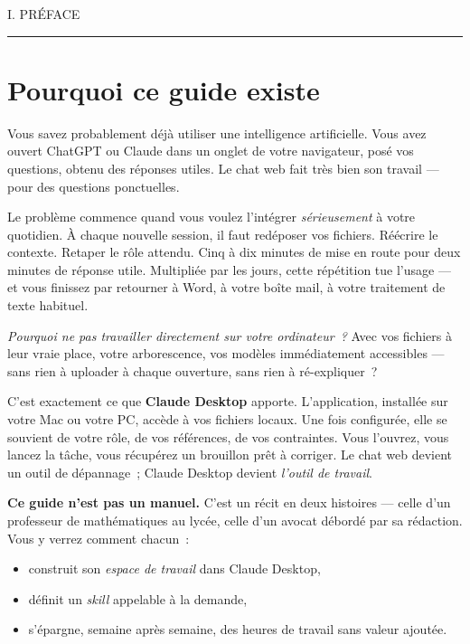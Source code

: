 \documentclass[11pt,a4paper]{article}
\newcommand{\dateline}[1]{{\footnotesize\ttfamily\color{encrefaint}\MakeUppercase{#1}}}
\begin{document}
\newpage


\dateline{I. \quad Préface}

\vspace{0.4cm}
{\color{encre}\rule{\linewidth}{0.4pt}}
\vspace{1cm}

\section*{Pourquoi ce guide existe}

Vous savez probablement déjà utiliser une intelligence artificielle. Vous avez
ouvert ChatGPT ou Claude dans un onglet de votre navigateur, posé vos questions,
obtenu des réponses utiles. Le chat web fait très bien son travail — pour des
questions ponctuelles.

Le problème commence quand vous voulez l'intégrer \textit{sérieusement} à
votre quotidien. À chaque nouvelle session, il faut redéposer vos fichiers.
Réécrire le contexte. Retaper le rôle attendu. Cinq à dix minutes de mise en
route pour deux minutes de réponse utile. Multipliée par les jours, cette
répétition tue l'usage — et vous finissez par retourner à Word, à votre boîte
mail, à votre traitement de texte habituel.

\textit{Pourquoi ne pas travailler directement sur votre ordinateur~?} Avec
vos fichiers à leur vraie place, votre arborescence, vos modèles
immédiatement accessibles — sans rien à uploader à chaque ouverture, sans
rien à ré-expliquer~?

C'est exactement ce que \textbf{Claude Desktop} apporte. L'application,
installée sur votre Mac ou votre PC, accède à vos fichiers locaux. Une fois
configurée, elle se souvient de votre rôle, de vos références, de vos
contraintes. Vous l'ouvrez, vous lancez la tâche, vous récupérez un
brouillon prêt à corriger. Le chat web devient un outil de dépannage~;
Claude Desktop devient \textit{l'outil de travail}.

\textbf{Ce guide n'est pas un manuel.} C'est un récit en deux histoires —
celle d'un professeur de mathématiques au lycée, celle d'un avocat débordé
par sa rédaction. Vous y verrez comment chacun~:

\begin{itemize}
  \item construit son \textit{espace de travail} dans Claude Desktop,
  \item définit un \textit{skill} appelable à la demande,
  \item s'épargne, semaine après semaine, des heures de travail sans valeur
        ajoutée.
\end{itemize}
\end{document}
